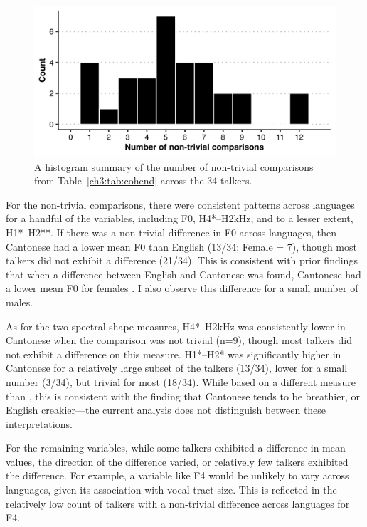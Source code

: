 \begin{figure}[htbp]
\begin{center}
\includegraphics[width=0.875\linewidth]{figures/ch3_nontrivial_counts_by_talker_5in.png} 
\caption{A histogram summary of the number of non-trivial comparisons from Table~\ref{ch3:tab:cohend} across the 34 talkers.}
\label{ch3:fig:ntcounts}
\end{center}
\end{figure}

For the non-trivial comparisons, there were consistent patterns across languages for a handful of the variables, including F0, H4*--H2kHz, and to a lesser extent, H1*--H2**. If there was a non-trivial difference in F0 across languages, then Cantonese had a lower mean F0 than English (13/34; Female = 7), though most talkers did not exhibit a difference (21/34). This is consistent with prior findings that when a difference between English and Cantonese was found, Cantonese had a lower mean F0 for females \citep{ng_2012_ltas,altenberg_2006_f0}. I also observe this difference for a small number of males.

As for the two spectral shape measures, H4*--H2kHz was consistently lower in Cantonese when the comparison was not trivial (n=9), though most talkers did not exhibit a difference on this measure. H1*--H2* was significantly higher in Cantonese for a relatively large subset of the talkers (13/34), lower for a small number (3/34), but trivial for most (18/34). While based on a different measure than \citep{ng_2012_ltas}, this is consistent with the finding that Cantonese tends to be breathier, or English creakier---the current analysis does not distinguish between these interpretations.

For the remaining variables, while some talkers exhibited a difference in mean values, the direction of the difference varied, or relatively few talkers exhibited the difference. For example, a variable like F4 would be unlikely to vary across languages, given its association with vocal tract size. This is reflected in the relatively low count of talkers with a non-trivial difference across languages for F4. 

